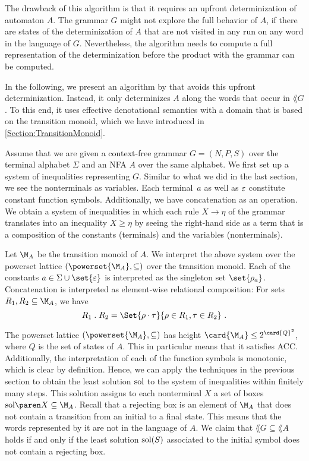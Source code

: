 \documentclass[../../diss.tex]{subfiles}
\begin{document}
The drawback of this algorithm is that it requires an upfront determinization of automaton $A$.
The grammar $G$ might not explore the full behavior of $A$, \eg if there are states of the determinization of $A$ that are not visited in any run on any word in the language of $G$.
Nevertheless, the algorithm needs to compute a full representation of the determinization before the product with the grammar can be computed.

In the following, we present an algorithm by  that avoids this upfront determinization.
Instead, it only determinizes $A$ along the words that occur in $\lang{G}$.
To this end, it uses effective denotational semantics with a domain that is based on the transition monoid, which we have introduced in \cref{Section:TransitionMonoid}.

Assume that we are given a context-free grammar $G = (N,P,S)$ over the terminal alphabet $\Sigma$ and an NFA $A$ over the same alphabet.
We first set up a system of inequalities representing $G$.
Similar to what we did in the last section, we see the nonterminals as variables.
Each terminal~$a$ as well as $\varepsilon$ constitute constant function symbols.
Additionally, we have concatenation as an operation.
We obtain a system of inequalities in which each rule
\(
    X \to \eta
\)
of the grammar translates into an inequality
\(
    X \geq \eta
\)
by seeing the right-hand side as a term that is a composition of the constants (terminals) and the variables (nonterminals).

Let $\nfatransmonoid{A}$ be the transition monoid of $A$.
We interpret the above system over the powerset lattice $(\powerset{\nfatransmonoid{A}},\subseteq)$ over the transition monoid.
Each of the constants $a \in \Sigma \cup \set{\eps}$ is interpreted as the singleton set $\set{ \tbox{a}}$.
Concatenation is interpreted as element-wise relational composition: For sets $R_1,R_2 \subseteq \nfatransmonoid{A}$, we have
\[
    R_1 \comp R_2
    =
    \Set{ \rho \relcomp \tau }{ \rho \in R_1, \tau \in R_2}
    \ .
\]

The powerset lattice $(\powerset{\nfatransmonoid{A}},\subseteq)$ has height $\card{\nfatransmonoid{A}} \leq 2^{\card{Q}^2}$, where $Q$ is the set of states of $A$.
This in particular means that it satisfies ACC.\@
Additionally, the interpretation of each of the function symbols is monotonic, which is clear by definition.
Hence, we can apply the techniques in the previous section to obtain the least solution $\sol$ to the system of inequalities within finitely many steps.
This solution assigns to each nonterminal $X$ a set of boxes $\sol{X} \subseteq \nfatransmonoid{A}$.
Recall that a rejecting box is an element of $\nfatransmonoid{A}$ that does not contain a transition from an initial to a final state.
This means that the words represented by it are not in the language of $A$.
We claim that $\lang{G} \subseteq \lang{A}$ holds if and only if the least solution $\sol(S)$ associated to the initial symbol does not contain a rejecting box.
\end{document}
